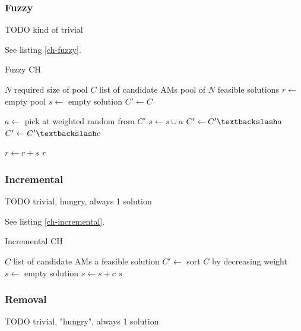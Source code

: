 \documentclass[a4paper,12pt,oneside]{report}
\begin{document}
\subsubsection{Fuzzy}

TODO kind of trivial

See listing \ref{ch-fuzzy}.

\begin{algorithm}
\caption{Fuzzy CH}
\label{ch-fuzzy}
\begin{algorithmic}
\REQUIRE $N$ required size of pool
\REQUIRE $C$ list of candidate AMs
\ENSURE pool of $N$ feasible solutions
\STATE $r \gets $ empty pool
\STATE {}
\STATE $s \gets $ empty solution
\STATE $C' \gets C$

\STATE $a \gets $ pick at weighted random from $C'$
\STATE $s \gets s \cup a$
\STATE $C' \gets C' \textbackslash a$
\ENDIF
{}
\STATE {}
\STATE $C' \gets C' \textbackslash c$
\ENDIF
\ENDFOR
\ENDWHILE

\STATE $r \gets r + s$
\ENDFOR
\RETURN $r$
\end{algorithmic}
\end{algorithm}

\subsubsection{Incremental}

TODO trivial, hungry, always 1 solution

See listing \ref{ch-incremental}.

\begin{algorithm}
\caption{Incremental CH}
\label{ch-incremental}
\begin{algorithmic}
\REQUIRE $C$ list of candidate AMs
\ENSURE a feasible solution
\STATE $C' \gets $ sort $C$ by decreasing weight
\STATE $s \gets $ empty solution
\STATE $s \gets s + c$
\ENDIF
\ENDFOR
\RETURN $s$
\end{algorithmic}
\end{algorithm}

\subsubsection{Removal}

TODO trivial, "hungry", always 1 solution
\end{document}
